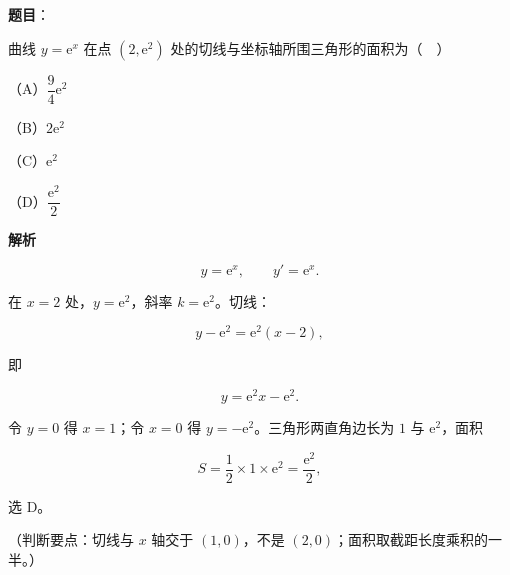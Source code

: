 \begin{answer}

\textbf{题目}：

曲线 $y=\mathrm e^x$ 在点 $(2,\mathrm e^2)$ 处的切线与坐标轴所围三角形的面积为（　）

（A）$\dfrac94\mathrm e^2$

（B）$2\mathrm e^2$

（C）$\mathrm e^2$

（D）$\dfrac{\mathrm e^2}{2}$

\textbf{解析}

\nopagebreak[4]
\[y=\mathrm e^x,\qquad y'=\mathrm e^x.\]

在 $x=2$ 处，$y=\mathrm e^2$，斜率 $k=\mathrm e^2$。切线：

\nopagebreak[4]
\[y-\mathrm e^2=\mathrm e^2(x-2),\]

即

\nopagebreak[4]
\[y=\mathrm e^2x-\mathrm e^2.\]

令 $y=0$ 得 $x=1$；令 $x=0$ 得 $y=-\mathrm e^2$。三角形两直角边长为 $1$ 与 $\mathrm e^2$，面积

\nopagebreak[4]
\[S=\frac12\times1\times\mathrm e^2=\frac{\mathrm e^2}{2},\]

选 D。

（判断要点：切线与 $x$ 轴交于 $(1,0)$，不是 $(2,0)$；面积取截距长度乘积的一半。）


\end{answer}
